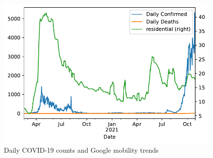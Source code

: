 \begin{figure}[htbp]
	\centering
	\includegraphics[width=0.9\linewidth]{data/confirmed.pdf}
	\caption{Daily COVID-19 counts and Google mobility trends}
	\label{confirm}
\end{figure}